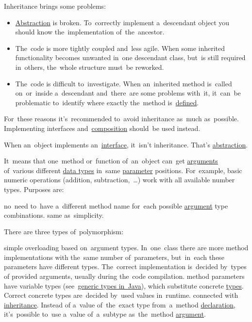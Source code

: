 \warning Inheritance brings some problems:
\begin{itemize}
    \item \hyperref[abstraction]{Abstraction} is broken.
          To~correctly implement a~descendant object you should know the~implementation of~the~ancestor.
    \item The~code is more tightly coupled and~less agile.
          When some inherited functionality becomes unwanted in~one descendant class, but~is still required in~others, the~whole structure must~be reworked.
    \item The~code is difficult to~investigate.
          When an~inherited method is~called on~or~inside a~descendant and~there~are some problems with~it, it~can~be problematic to~identify where exactly the~method is~\hyperref[declarationdefinition]{defined}.
\end{itemize}
For~these reasons it's~recommended to~avoid inheritance as~much as~possible.
Implementing interfaces and~\hyperref[compositionoverinheritance]{composition} should~be used instead.

\warning When an~object implements an~\hyperref[javainterface]{interface}, it~isn't inheritance.
That's \hyperref[abstraction]{abstraction}.

\label{polymorphism}
It~means that one~method or~function of~an~object can~get \hyperref[parameterargument]{arguments} of~various different \hyperref[datatypes]{data types} in~same \hyperref[parameterargument]{parameter} positions.
For~example, basic numeric operations (addition, subtraction,~\dots) work with all available number types.
Purposes are:
\begin{itemize}
     no~need to~have a~different method name for~each possible \hyperref[parameterargument]{argument} type combinations.
     same as~simplicity.
\end{itemize}
\newpage

\noindent There are three types of~polymorphism:
\begin{itemize}
     simple overloading based on~argument types.
             In~one~class there are more method implementations with the~same number of~parameters, but~in~each these parameters have different types.
             The~correct implementation is~decided by~types of provided arguments, usually during the~code compilation.
     method parameters have variable types (see~\hyperref[javagenerics]{generic types in~Java}), which substitute concrete \hyperref[datatypes]{types}.
             Correct concrete types are~decided by~used values in~runtime.
     connected with \hyperref[inheritance]{inheritance}.
             Instead of a~value of~the~exact type from~a~method \hyperref[declarationdefinition]{declaration}, it's~possible to~use a~value of~a~subtype as~the~method \hyperref[parameterargument]{argument}.
\end{itemize}

